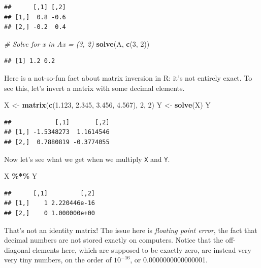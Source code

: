 \documentclass[
  12pt,
  oneside,openany]{book}
\newenvironment{Shaded}{\begin{snugshade}}{\end{snugshade}}
\newcommand{\CommentTok}[1]{\textcolor[rgb]{0.56,0.35,0.01}{\textit{#1}}}
\newcommand{\DecValTok}[1]{\textcolor[rgb]{0.00,0.00,0.81}{#1}}
\newcommand{\FloatTok}[1]{\textcolor[rgb]{0.00,0.00,0.81}{#1}}
\newcommand{\KeywordTok}[1]{\textcolor[rgb]{0.13,0.29,0.53}{\textbf{#1}}}
\newcommand{\NormalTok}[1]{#1}
\newcommand{\OperatorTok}[1]{\textcolor[rgb]{0.81,0.36,0.00}{\textbf{#1}}}
\newcommand{\StringTok}[1]{\textcolor[rgb]{0.31,0.60,0.02}{#1}}
\begin{document}
\begin{verbatim}
##      [,1] [,2]
## [1,]  0.8 -0.6
## [2,] -0.2  0.4
\end{verbatim}

\begin{Shaded}
\begin{Highlighting}[]
\CommentTok{\# Solve for x in Ax = (3, 2)}
\KeywordTok{solve}\NormalTok{(A, }\KeywordTok{c}\NormalTok{(}\DecValTok{3}\NormalTok{, }\DecValTok{2}\NormalTok{))}
\end{Highlighting}
\end{Shaded}

\begin{verbatim}
## [1] 1.2 0.2
\end{verbatim}

Here is a not-so-fun fact about matrix inversion in R: it's not entirely exact. To see this, let's invert a matrix with some decimal elements.

\begin{Shaded}
\begin{Highlighting}[]
\NormalTok{X <{-}}\StringTok{ }\KeywordTok{matrix}\NormalTok{(}\KeywordTok{c}\NormalTok{(}\FloatTok{1.123}\NormalTok{, }\FloatTok{2.345}\NormalTok{, }\FloatTok{3.456}\NormalTok{, }\FloatTok{4.567}\NormalTok{), }\DecValTok{2}\NormalTok{, }\DecValTok{2}\NormalTok{)}
\NormalTok{Y <{-}}\StringTok{ }\KeywordTok{solve}\NormalTok{(X)}
\NormalTok{Y}
\end{Highlighting}
\end{Shaded}

\begin{verbatim}
##            [,1]       [,2]
## [1,] -1.5348273  1.1614546
## [2,]  0.7880819 -0.3774055
\end{verbatim}

Now let's see what we get when we multiply \texttt{X} and \texttt{Y}.

\begin{Shaded}
\begin{Highlighting}[]
\NormalTok{X }\OperatorTok{\%*\%}\StringTok{ }\NormalTok{Y}
\end{Highlighting}
\end{Shaded}

\begin{verbatim}
##      [,1]         [,2]
## [1,]    1 2.220446e-16
## [2,]    0 1.000000e+00
\end{verbatim}

That's not an identity matrix! The issue here is \emph{floating point error}, the fact that decimal numbers are not stored exactly on computers. Notice that the off-diagonal elements here, which are supposed to be exactly zero, are instead very very tiny numbers, on the order of \(10^{-16}\), or 0.0000000000000001.
\end{document}

